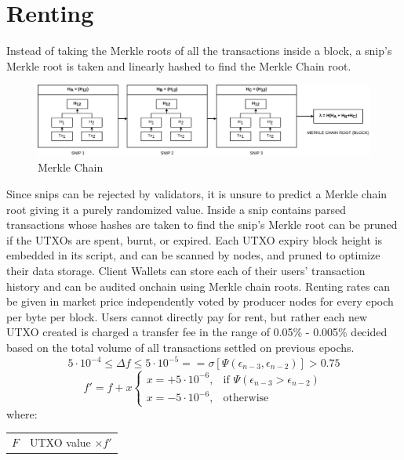 \documentclass[a4paper,10pt]{article}
\makeatletter
\newenvironment{conditions}
  {\par\vspace{\abovedisplayskip}\noindent\begin{tabular}{>{$}l<{$} @{${}={}$} l}}
  {\end{tabular}\par\vspace{\belowdisplayskip}}
\makeatother
\begin{document}
\section{Renting}
Instead of taking the Merkle roots of all the transactions inside a block, a snip's Merkle root is taken and linearly hashed to find the Merkle Chain root. \\
\begin{figure}[h]
\begin{center}
\includegraphics[width=13cm]{merklechain}
\caption{Merkle Chain}
\end{center}
\end{figure}
\indent Since snips can be rejected by validators, it is unsure to predict a Merkle chain root giving it a purely randomized value. Inside a snip contains parsed transactions whose hashes are taken to find the snip's Merkle root can be pruned if the UTXOs are spent, burnt, or expired. Each UTXO expiry block height is embedded in its script, and can be scanned by nodes, and pruned to optimize their data storage. Client Wallets can store each of their users' transaction history and can be audited onchain using Merkle chain roots. Renting rates can be given in market price independently voted by producer nodes for every epoch per byte per block. Users cannot directly pay for rent, but rather each new UTXO created is charged a transfer fee in the range of 0.05\% - 0.005\% decided based on the total volume of all transactions settled on previous epochs.
\begin{equation}
5 \cdot 10^{-4} \leq \Delta f \leq 5 \cdot 10^{-5} == \sigma [\Psi (\epsilon_{n-3}, \epsilon_{n-2})] > 0.75
\end{equation}
\begin{equation}
f'=f+x \begin{cases}
x=+5 \cdot 10^{-6}, & \text{if } \Psi (\epsilon_{n-3} > \epsilon_{n-2})\\
x=-5 \cdot 10^{-6}, & \text{otherwise}
\end{cases}
\end{equation}
where:
\begin{conditions}
F & UTXO value $\times f'$ 
\end{conditions}
\end{document}
